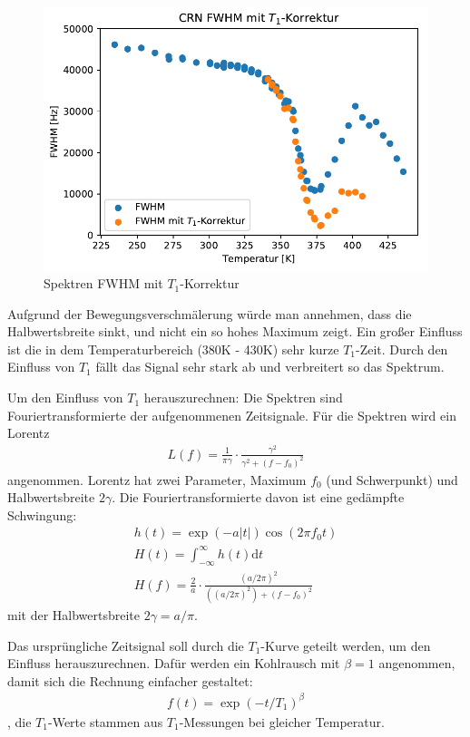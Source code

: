 \begin{figure}
	\begin{center}
		\includegraphics[width=\textwidth]{graphics/plots/SPEK/spek_t1korr.pdf}
	\end{center}
	\caption{Spektren FWHM mit $T_1$-Korrektur} \label{fig:res:spek_fwhm_t1}
\end{figure}
Aufgrund der Bewegungsverschmälerung würde man annehmen, dass die Halbwertsbreite sinkt, und nicht ein so hohes Maximum zeigt. Ein großer Einfluss ist die in dem Temperaturbereich (380K - 430K) sehr kurze $T_1$-Zeit. Durch den Einfluss von $T_1$ fällt das Signal sehr stark ab und verbreitert so das Spektrum.

Um den Einfluss von $T_1$ herauszurechnen: Die Spektren sind Fouriertransformierte der aufgenommenen Zeitsignale. Für die Spektren wird ein Lorentz 
\begin{align}
    L(f) = \frac{1}{\pi \gamma} \cdot \frac{\gamma^2}{\gamma^2 + (f - f_0)^2}
\end{align}
angenommen. Lorentz hat zwei Parameter, Maximum $f_0$ (und Schwerpunkt) und Halbwertsbreite $2\gamma$. Die Fouriertransformierte davon ist eine gedämpfte Schwingung:
\begin{align}
    h(t) = \exp{(-a |t|)} \cos{(2 \pi f_0 t)} \\
    H(t) = \int_{-\infty}^{\infty} h(t) \text{d} t \\
    H(f) = \frac{2}{a} \cdot \frac{(a/2\pi)^2}{((a/2\pi)^2) + (f - f_0)^2}
\end{align}
mit der Halbwertsbreite $2 \gamma = a/\pi$.

Das ursprüngliche Zeitsignal soll durch die $T_1$-Kurve geteilt werden, um den Einfluss herauszurechnen. Dafür werden ein Kohlrausch mit $\beta = 1$ angenommen, damit sich die Rechnung einfacher gestaltet:
\begin{align}
    f(t) = \exp{(-t/T_1)^\beta}
\end{align}
, die $T_1$-Werte stammen aus $T_1$-Messungen bei gleicher Temperatur. 

